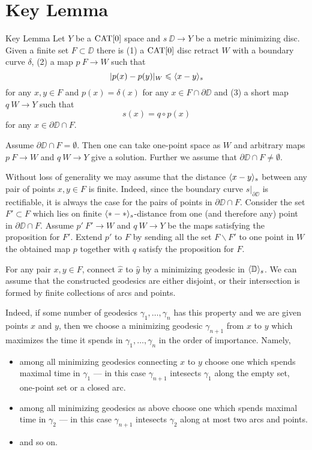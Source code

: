 \section{Key Lemma}\label{Key Lemma}


\begin{thm}{Key Lemma}\label{lem:key}
Let $Y$ be a $\mathop{\rm CAT}\nolimits[0]$ space and $s\:\DD\to Y$ 
be a metric minimizing disc.
Given a finite set $F\subset \DD$
there is 
(1) a $\mathop{\rm CAT}\nolimits[0]$ disc retract $W$ with a boundary curve $\delta$,
(2) a map $p\:F\to W$ such that
\[|p(x)-p(y)|_W\leqslant \langle x-y\rangle_s\] 
for any $x,y\in F$ and $p(x)=\delta(x)$ for any $x\in F\cap \partial\DD$
and (3) a short map $q\:W\to Y$ such that
\[s(x)=q\circ p(x)\] 
for any $x\in\partial\DD\cap F$.
\end{thm} 

 Assume $\partial \DD\cap F= \emptyset$.
Then one can take one-point space as $W$ and arbitrary maps $p\:F\to W$ and $q\:W\to Y$ give a solution.
Further we assume that $\partial \DD\cap F\ne\emptyset$.

Without loss of generality we may assume that the distance $\langle x-y\rangle_s$
between any pair of points $x,y\in F$ is finite.
Indeed, since the boundary curve $s|_{\partial\DD}$ is rectifiable,
it is always the case for the pairs of points in $\partial \DD\cap F$.
Consider the set $F'\subset F$ which lies on finite $\langle{*}-{*}\rangle_s$-distance from one (and therefore any) point in $\partial \DD\cap F$.
Assume $p'\:F'\to W$ and $q\:W\to Y$ be the maps satisfying the proposition for $F'$.
Extend $p'$ to $F$ by sending all the set $F\backslash F'$ to one point in $W$ the obtained map $p$ together with $q$ satisfy the proposition for $F$.

For any pair $x,y\in F$, connect $\hat x$ to $\hat y$ by a minimizing geodesic in $\langle\mathbb{D}\rangle_s$. 
We can assume that the constructed geodesics 
are either disjoint, or their intersection is formed by finite collections of arcs and points.

Indeed, if some number of geodesics $\gamma_1,\dots,\gamma_n$ has this property and we are given points $x$ and $y$, then
we choose a minimizing geodesic $\gamma_{n+1}$ from $x$ to $y$ which maximizes the time it spends in $\gamma_1,\dots,\gamma_n$  in the order of importance.
Namely, 
\begin{itemize}
\item  among all minimizing geodesics connecting $x$ to $y$
choose one which spends maximal time in $\gamma_1$ --- in this case $\gamma_{n+1}$ intesects $\gamma_1$ along the empty set, one-point set or a closed arc.
\item among all minimizing geodesics as above
choose one which spends maximal time in $\gamma_2$ --- in this case $\gamma_{n+1}$ intesects $\gamma_2$ along at most two arcs and points.
\item and so on.
\end{itemize}

